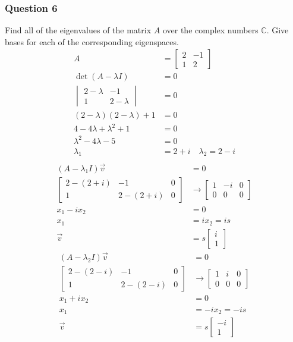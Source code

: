 \documentclass{math}
\begin{document}
\subsubsection*{Question 6}
Find all of the eigenvalues of the matrix \( A \) over the complex numbers
\( \mathbb{C} \). Give bases for each of the corresponding eigenspaces.
\begin{align*}
  A &= \begin{bmatrix}
    2 & -1 \\
    1 & 2
  \end{bmatrix} \\
  \det(A-\lambda I) &= 0 \\
  \begin{vmatrix}
    2-\lambda & -1 \\
    1 & 2-\lambda
  \end{vmatrix} &= 0 \\
  (2-\lambda)(2-\lambda)+1 &= 0 \\
  4-4\lambda+\lambda^2+1 &= 0 \\
  \lambda^2-4\lambda-5 &= 0 \\
  \lambda_1 &= 2+i \quad \lambda_2 = 2-i \\
\end{align*}
\begin{align*}
  (A-\lambda_1 I)\vec{v} &= 0 \\
  \begin{bmatrix}
    2-(2+i) & -1 & 0 \\
    1 & 2-(2+i) & 0
  \end{bmatrix} &\to \begin{bmatrix}
    1 & -i & 0 \\
    0 & 0 & 0
  \end{bmatrix} \\
  x_1-ix_2 &= 0 \\
  x_1 &= ix_2 = is \\
  \vec{v} &= s\begin{bmatrix}i \\ 1\end{bmatrix}
\end{align*}
\begin{align*}
  (A-\lambda_2 I)\vec{v} &= 0 \\
  \begin{bmatrix}
    2-(2-i) & -1 & 0 \\
    1 & 2-(2-i) & 0
  \end{bmatrix} &\to \begin{bmatrix}
    1 & i & 0 \\
    0 & 0 & 0
  \end{bmatrix} \\
  x_1+ix_2 &= 0 \\
  x_1 &= -ix_2 = -is \\
  \vec{v} &= s\begin{bmatrix}-i \\ 1\end{bmatrix}
\end{align*}
\end{document}
